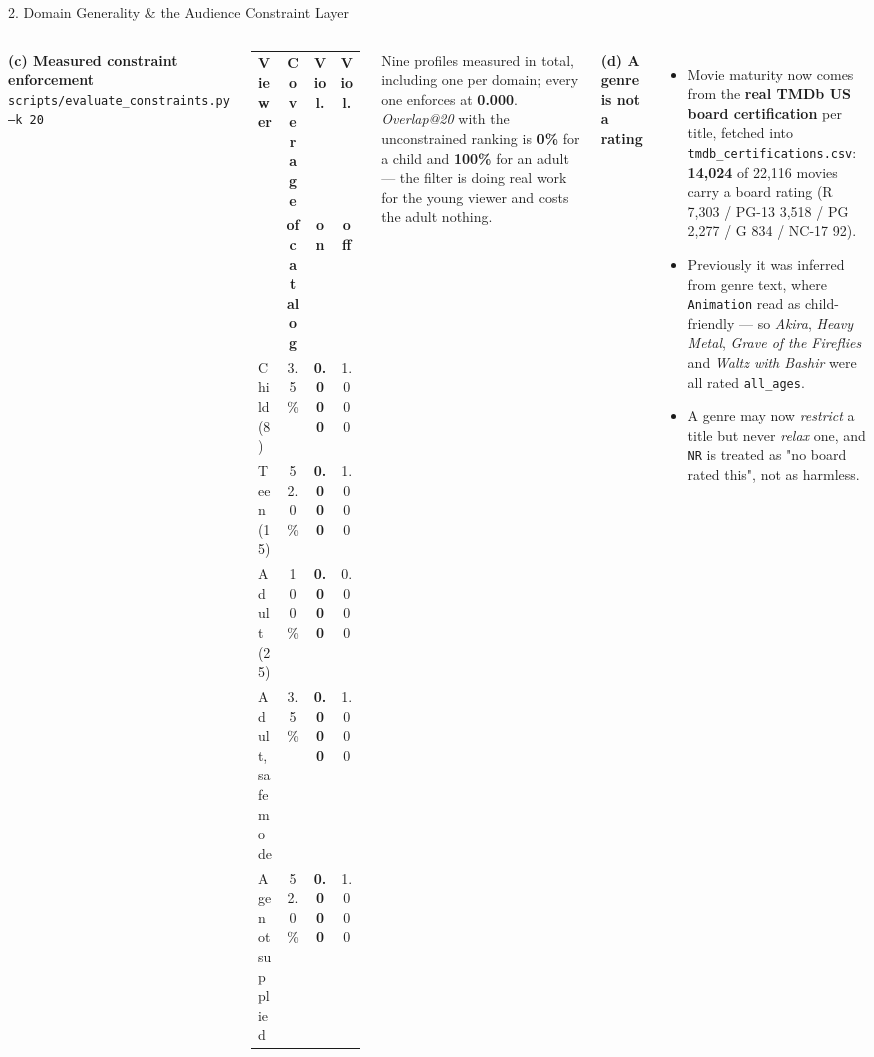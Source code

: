 \documentclass[aspectratio=169, 11pt]{beamer}
\begin{document}
\begin{frame}{2. Domain Generality \& the Audience Constraint Layer}
\begin{columns}[T]
{\scriptsize \textbf{(c) Measured constraint enforcement}}\\
{\tiny \hspace{1mm} \texttt{scripts/evaluate\_constraints.py --k 20}}
\vspace{-1mm}
\begin{table}
\centering
\tiny
\renewcommand{\arraystretch}{1.18}
\begin{tabular}{p{1.55cm} c c c}
\toprule
\textbf{Viewer} & \textbf{Coverage} & \textbf{Viol.} & \textbf{Viol.} \\
 & \textbf{of catalog} & \textbf{on} & \textbf{off} \\
\midrule
Child (8)        & 3.5\%   & \textbf{0.000} & 1.000 \\
Teen (15)        & 52.0\%  & \textbf{0.000} & 1.000 \\
Adult (25)       & 100\%   & \textbf{0.000} & 0.000 \\
Adult, safe mode & 3.5\%   & \textbf{0.000} & 1.000 \\
Age not supplied & 52.0\%  & \textbf{0.000} & 1.000 \\
\bottomrule
\end{tabular}
\end{table}
\vspace{-2mm}
{\tiny Nine profiles measured in total, including one per domain; every one enforces at
\textbf{0.000}. \emph{Overlap@20} with the unconstrained ranking is \textbf{0\%} for a child and
\textbf{100\%} for an adult --- the filter is doing real work for the young viewer and costs the
adult nothing.}
\vspace{1.5mm}

{\scriptsize \textbf{(d) A genre is not a rating}}
\begin{itemize}\tiny
  \item Movie maturity now comes from the \textbf{real TMDb US board certification} per title, fetched into \texttt{tmdb\_certifications.csv}: \textbf{14{,}024} of 22{,}116 movies carry a board rating (R 7{,}303 / PG-13 3{,}518 / PG 2{,}277 / G 834 / NC-17 92).
  \item Previously it was inferred from genre text, where \texttt{Animation} read as child-friendly --- so \emph{Akira}, \emph{Heavy Metal}, \emph{Grave of the Fireflies} and \emph{Waltz with Bashir} were all rated \texttt{all\_ages}.
  \item A genre may now \emph{restrict} a title but never \emph{relax} one, and \texttt{NR} is treated as "no board rated this", not as harmless.
\end{itemize}
\end{columns}
\end{frame}
\end{document}
